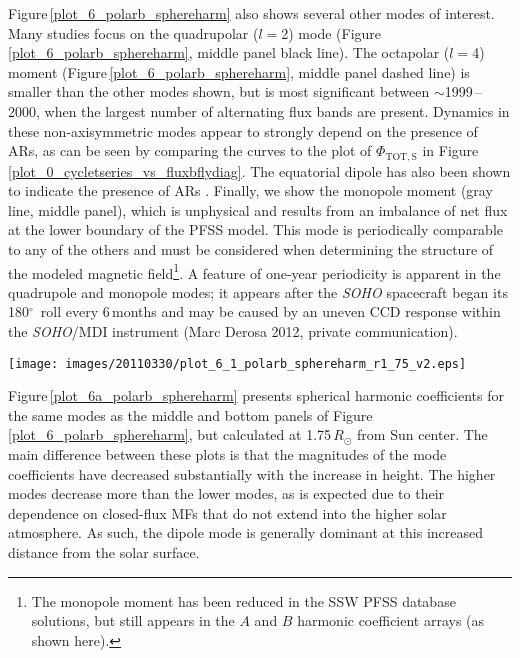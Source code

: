 \documentclass[namedreferences]{solarphysics}
\newcommand{\degr}{\ensuremath{^\circ}}
\begin{document}
\begin{article}
Figure\,\ref{plot_6_polarb_sphereharm} also shows several other modes of interest. Many studies \citep[e.g.,][]{mordvinov:2007,DeRosa:2012} focus on the quadrupolar ($l$$=$2) mode (Figure\,\ref{plot_6_polarb_sphereharm}, middle panel black line).
The octapolar ($l$$=$4) moment (Figure\,\ref{plot_6_polarb_sphereharm}, middle panel dashed line) is smaller than the other modes shown, but is most significant between $\sim$1999\,--\,2000, when the largest number of alternating flux bands are present. Dynamics in these non-axisymmetric modes appear to strongly depend on the presence of ARs, as can be seen by comparing the curves to the plot of $\Phi_{\mathrm{TOT,S}}$ in Figure\,\ref{plot_0_cycletseries_vs_fluxbflydiag}. The equatorial dipole has also been shown to indicate the presence of ARs \citep{Petrie:2013}. Finally, we show the monopole moment (gray line, middle panel), which is unphysical and results from an imbalance of net flux at the lower boundary of the PFSS model. This mode is periodically comparable to any of the others and must be considered when determining the structure of the modeled magnetic field\footnote{The monopole moment has been reduced in the SSW PFSS database solutions, but still appears in the $A$ and $B$ harmonic coefficient arrays (as shown here).}. A feature of one-year periodicity is apparent in the quadrupole and monopole modes; it appears after the \emph{SOHO} spacecraft began its 180\degr\ roll every 6\,months and may be caused by an uneven CCD response within the \emph{SOHO}/MDI instrument (Marc Derosa 2012, private communication).


\begin{figure*}[!t]
\sidecaption
\texttt{[image: images/20110330/plot\_6\_1\_polarb\_sphereharm\_r1\_75\_v2.eps]}
\caption{PFSS spherical harmonic coefficients as in the middle and bottom panels of Figure\,\ref{plot_6_polarb_sphereharm}, but calculated at a height of 1.75\,$R_{\odot}$ from Sun center.}
\label{plot_6a_polarb_sphereharm}
\end{figure*}

Figure\,\ref{plot_6a_polarb_sphereharm} presents spherical harmonic coefficients for the same modes as the middle and bottom panels of Figure\,\ref{plot_6_polarb_sphereharm}, but calculated at 1.75\,$R_{\odot}$ from Sun center. The main difference between these plots is that the magnitudes of the mode coefficients have decreased substantially with the increase in height. The higher modes decrease more than the lower modes, as is expected due to their dependence on closed-flux MFs that do not extend into the higher solar atmosphere. As such, the dipole mode is generally dominant at this increased distance from the solar surface. 


\end{article}
\end{document}

